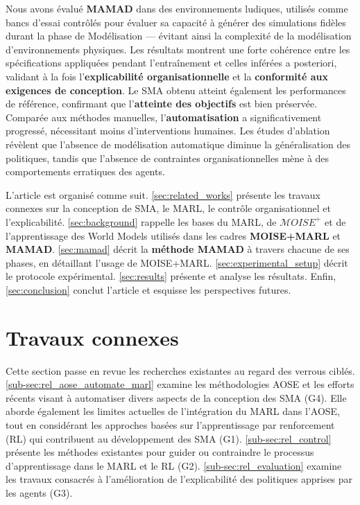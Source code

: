 \documentclass[pdflatex,sn-mathphys-num]{sn-jnl}%
\theoremstyle{thmstyleone}%
\theoremstyle{thmstyletwo}%
\theoremstyle{thmstylethree}%
\begin{document}
Nous avons évalué \textbf{MAMAD} dans des environnements ludiques, utilisés comme bancs d’essai contrôlés pour évaluer sa capacité à générer des simulations fidèles durant la phase de Modélisation — évitant ainsi la complexité de la modélisation d’environnements physiques. Les résultats montrent une forte cohérence entre les spécifications appliquées pendant l’entraînement et celles inférées a posteriori, validant à la fois l’\textbf{explicabilité organisationnelle} et la \textbf{conformité aux exigences de conception}. Le SMA obtenu atteint également les performances de référence, confirmant que l’\textbf{atteinte des objectifs} est bien préservée. Comparée aux méthodes manuelles, l’\textbf{automatisation} a significativement progressé, nécessitant moins d’interventions humaines. Les études d’ablation révèlent que l’absence de modélisation automatique diminue la généralisation des politiques, tandis que l’absence de contraintes organisationnelles mène à des comportements erratiques des agents.

\vspace{0.5em}

L’article est organisé comme suit. \autoref{sec:related_works} présente les travaux connexes sur la conception de SMA, le MARL, le contrôle organisationnel et l’explicabilité. \autoref{sec:background} rappelle les bases du MARL, de $\mathcal{M}OISE^+$ et de l’apprentissage des World Models utilisés dans les cadres \textbf{MOISE+MARL} et \textbf{MAMAD}. \autoref{sec:mamad} décrit la \textbf{méthode MAMAD} à travers chacune de ses phases, en détaillant l’usage de MOISE+MARL. \autoref{sec:experimental_setup} décrit le protocole expérimental. \autoref{sec:results} présente et analyse les résultats. Enfin, \autoref{sec:conclusion} conclut l’article et esquisse les perspectives futures.


\section{Travaux connexes}\label{sec:related_works}

Cette section passe en revue les recherches existantes au regard des verrous ciblés. \autoref{sub-sec:rel_aose_automate_marl} examine les méthodologies AOSE et les efforts récents visant à automatiser divers aspects de la conception des SMA (G4). Elle aborde également les limites actuelles de l’intégration du MARL dans l’AOSE, tout en considérant les approches basées sur l’apprentissage par renforcement (RL) qui contribuent au développement des SMA (G1). \autoref{sub-sec:rel_control} présente les méthodes existantes pour guider ou contraindre le processus d’apprentissage dans le MARL et le RL (G2).
\autoref{sub-sec:rel_evaluation} examine les travaux consacrés à l’amélioration de l’explicabilité des politiques apprises par les agents (G3).
\end{document}
